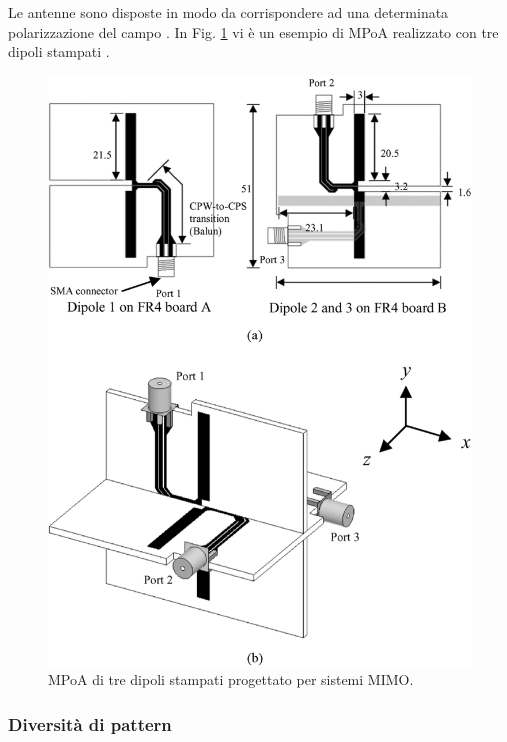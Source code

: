 \documentclass[technote]{IEEEtran}
\begin{document}
\par Le antenne sono disposte in modo da corrispondere ad una determinata polarizzazione del campo \cite{Zhang, Das2004}. In Fig. \ref{fig:52} vi è un esempio di MPoA realizzato con tre dipoli stampati \cite{Chui2007}.
\begin{figure}[h]
\centering
\includegraphics[width=.95\columnwidth]{figure52}
\caption{MPoA di tre dipoli stampati progettato per sistemi MIMO.}
\label{fig:52}
\end{figure}

\subsubsection{Diversità  di pattern}
\end{document}
